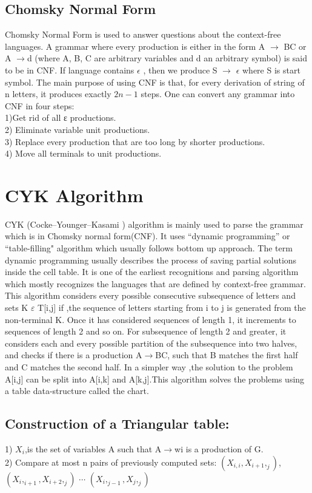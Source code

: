 \documentclass[12pt]{article}
\begin{document}
\subsection{Chomsky Normal Form}
Chomsky Normal Form is used to answer questions about  the context-free languages. A grammar where every production is either in the form A $\rightarrow$ BC or A $\rightarrow$d (where A, B, C are arbitrary variables and d an arbitrary symbol) is said to be in CNF. If language contains $\epsilon$ , then we produce S $\rightarrow$ $\epsilon$ where S is start symbol. The main purpose of using CNF is that, for every derivation of string of n letters, it produces exactly $2n-1$ steps. One can convert any grammar into CNF in four steps:\\
1)Get rid of all ε productions.\\
2) Eliminate variable unit productions.\\
3) Replace every production that are too long by shorter productions.\\
4) Move all terminals to unit productions.\\
\section{CYK Algorithm}
CYK (Cocke–Younger–Kasami ) algorithm is mainly used to parse the grammar which is in Chomsky normal form(CNF). It uses ``dynamic programming” or ``table-filling" algorithm which usually follows bottom up approach. The term dynamic programming usually describes the process of saving partial solutions inside the cell table. It is one of the earliest recognitions and parsing algorithm which mostly recognizes the languages that are defined by context-free grammar.
This algorithm considers every possible consecutive subsequence of letters and sets K $\varepsilon $ T[i,j] if ,the sequence of letters starting from i to j is generated from the non-terminal K.  Once it has considered sequences of length 1, it increments to sequences of length 2 and so on.  For subsequence of length 2 and greater, it considers each and every possible partition of the subsequence into two halves, and checks if there is a production A$\rightarrow$BC, such that B matches the first half and C matches the second half. In a simpler way ,the solution to the problem A[i,j] can be split into A[i,k] and A[k,j].This algorithm solves the problems using a table data-structure called the chart.

\vspace{30 mm}
\subsection{Construction of a Triangular table:}
1)	$X_i$,is the set of variables A such that A$\rightarrow$wi is a production of G.\\
2)	Compare at most n pairs of previously computed sets:
$(X_{i,i}, X_{i+1},_ j )$, $(X_i,_ {i+1} , X_{i+2},_ j )$ $\cdots$ $(X_i,_ {j-1} , X_j,_ j )$
\end{document}
